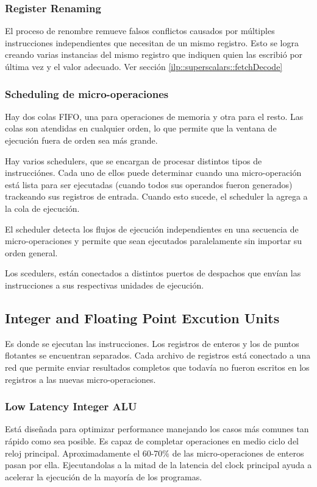 \subsubsection*{Register Renaming}
El proceso de renombre remueve falsos conflictos causados por múltiples instrucciones independientes que necesitan de un mismo registro. Esto se logra creando varias instancias del mismo registro que indiquen quien las escribió por última vez y el valor adecuado. Ver sección \ref{ilp::superscalars::fetchDecode} 

\subsubsection*{Scheduling de micro-operaciones}
Hay dos colas FIFO, una para operaciones de memoria y otra para el resto. Las colas son atendidas en cualquier orden, lo que permite que la ventana de ejecución fuera de orden sea más grande.

Hay varios schedulers, que se encargan de procesar distintos tipos de instrucciónes. Cada uno de ellos puede determinar cuando una micro-operación está lista para ser ejecutadas (cuando todos sus operandos fueron generados) trackeando sus registros de entrada. Cuando esto sucede, el scheduler la agrega a la cola de ejecución.

El scheduler detecta los flujos de ejecución independientes en una secuencia de micro-operaciones y permite que sean ejecutados paralelamente sin importar su orden general.

Los scedulers, están conectados a distintos puertos de despachos que envían las instrucciones a sus respectivas unidades de ejecución.

\subsection{Integer and Floating Point Excution Units}
Es donde se ejecutan las instrucciones.
Los registros de enteros y los de puntos flotantes se encuentran separados. Cada archivo de registros está conectado a una red que permite enviar resultados completos que todavía no fueron escritos en los registros a las nuevas micro-operaciones.

\subsubsection*{Low Latency Integer ALU}
Está diseñada para optimizar performance manejando los casos más comunes tan rápido como sea posible. Es capaz de completar operaciones en medio ciclo del reloj principal. Aproximadamente el 60-70\% de las micro-operaciones de enteros pasan por ella. Ejecutandolas a la mitad de la latencia del clock principal ayuda a acelerar la ejecución de la mayoría de los programas.

